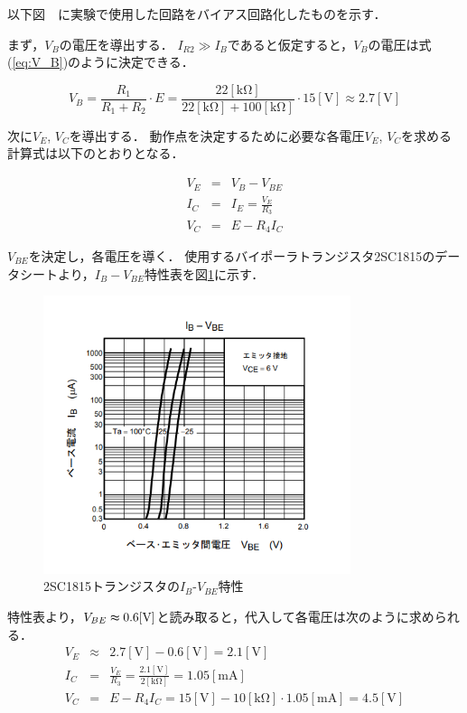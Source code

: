 \documentclass[dvipdfmx,titlepage,a4j]{jsarticle}  %
\numberwithin{equation}{section}
\begin{document}
以下図　に実験で使用した回路をバイアス回路化したものを示す．

まず，$V_B$の電圧を導出する．
$I_{R2} \gg  I_B$であると仮定すると，$V_B$の電圧は式(\ref{eq:V_B})のように決定できる．

\begin{equation}
  V_B = \frac{R_1}{R_1 + R_2} \cdot E = \frac{22 \mathrm{[k\Omega]}}{22 \mathrm{[k\Omega]} + 100 \mathrm{[k\Omega]}} \cdot 15 \mathrm{[V]} \approx  2.7 \mathrm{[V]}
  \label{eq:V_B}
\end{equation}

次に$V_{E}$, $V_{C}$を導出する．
動作点を決定するために必要な各電圧$V_{E}$, $V_{C}$を求める計算式は以下のとおりとなる．

\begin{eqnarray}
  V_E &=& V_B - V_{BE} \\
  I_C &=& I_E = \frac{V_E}{R_3} \\
  V_C &=& E - R_4 I_C
\end{eqnarray}

$V_{BE}$を決定し，各電圧を導く．
使用するバイポーラトランジスタ2SC1815のデータシートより，$I_B - V_{BE}$特性表を図\ref{fig:ibvbe.png}に示す．
\begin{figure}[H]
  \centering
  \includegraphics[width=9cm]{../2sc1815/ibvbe.png}
  \caption{2SC1815トランジスタの$I_B$-$V_{BE}$特性}
  \label{fig:ibvbe.png}
\end{figure}

特性表より，$V_{BE}\thickapprox 0.6 \mathrm{[V]}$と読み取ると，代入して各電圧は次のように求められる．
\begin{eqnarray}
  V_E &\approx& 2.7\mathrm{[V]} - 0.6\mathrm{[V]} = 2.1\mathrm{[V]}\\
  \label{eq:I_C}
  I_C &=& \frac{V_E}{R_3} = \frac{2.1\mathrm{[V]}}{2\mathrm{[k\Omega]}} = 1.05\mathrm{[mA]}\\
  V_C &=& E - R_4 I_C = 15\mathrm{[V]} - 10\mathrm{[k\Omega]} \cdot 1.05\mathrm{[mA]} = 4.5\mathrm{[V]}
\end{eqnarray}
\end{document}

